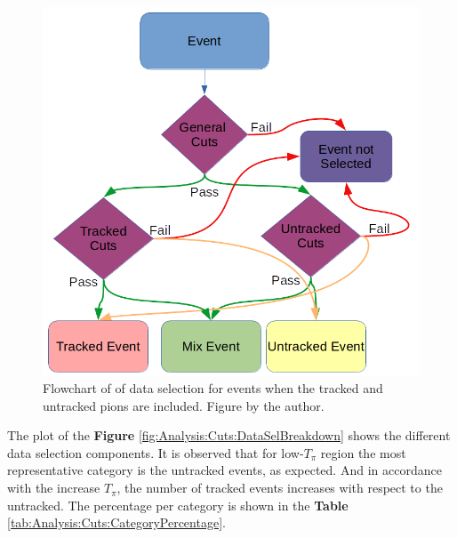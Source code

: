 \begin{figure}[!htb]
    \centering
    \includegraphics[scale=0.35]{Figures/Chapter4/DataSelection/EventSelFlowchart.png}
    \caption{Flowchart of of data selection for events when the tracked and untracked pions are included. Figure by the author.}
    \label{fig:Analysis:Cuts:Flowchart}
\end{figure}

 The plot of the \textbf{Figure} \ref{fig:Analysis:Cuts:DataSelBreakdown} shows the different data selection components. It is observed that for low-$T_\pi$ region the most representative category is the untracked events, as expected. And in accordance with the increase $T_\pi$, the number of tracked events increases with respect to the untracked. The percentage per category is shown in the \textbf{Table} \ref{tab:Analysis:Cuts:CategoryPercentage}.

